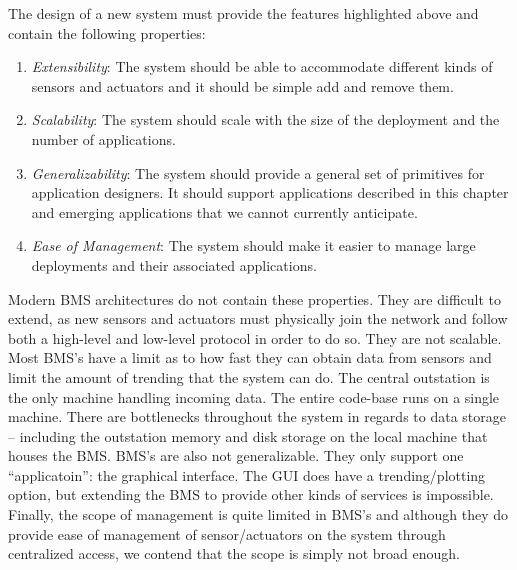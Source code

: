 
The design of a new system must provide the features highlighted above and contain the following properties:

\begin{enumerate}

\item \emph{Extensibility}:  The system should be able to accommodate different kinds of sensors and actuators and it should
be simple add and remove them.

\item \emph{Scalability}:  The system should scale with the size of the deployment and the number of applications.%

\item \emph{Generalizability}:  The system should provide a general set of primitives for application designers.  It should support applications
described in this chapter and emerging applications that we cannot currently anticipate.

\item \emph{Ease of Management}: The system should make it easier to manage large deployments and their associated applications.

\end{enumerate}

Modern BMS architectures do not contain these properties.  They are difficult to extend, as new sensors and actuators must physically join 
the network and follow both a high-level and low-level protocol in order to do so.  They are not scalable.  Most BMS's have a limit as to
how fast they can obtain data from sensors and limit the amount of trending that the system can do.  The central outstation is the only
machine handling incoming data.  The entire code-base runs on a single machine.  There are bottlenecks throughout the system in regards to
data storage -- including the outstation memory and disk storage on the local machine that houses the BMS.  BMS's are also not generalizable.
They only support one ``applicatoin'': the graphical interface.  The GUI does have a trending/plotting option, but extending the BMS
to provide other kinds of services is impossible.  Finally, the scope of management is quite limited in BMS's and although they do provide
ease of management of sensor/actuators on the system through centralized access, we contend that the scope is simply not broad enough.

